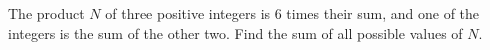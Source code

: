The product $N$ of three positive integers is $6$ times their sum, and one of the integers is the sum of the other two. Find the sum of all possible values of $N.$